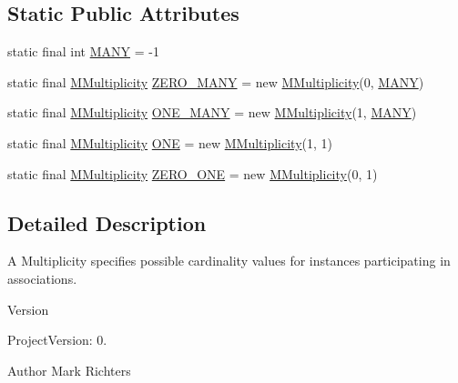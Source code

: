 \subsection*{Static Public Attributes}
\begin{DoxyCompactItemize}
\item 
static final int \hyperlink{classorg_1_1tzi_1_1use_1_1uml_1_1mm_1_1_m_multiplicity_acd7f611900ba6c8f7b48133cc4c4be22}{M\-A\-N\-Y} = -\/1
\item 
static final \hyperlink{classorg_1_1tzi_1_1use_1_1uml_1_1mm_1_1_m_multiplicity}{M\-Multiplicity} \hyperlink{classorg_1_1tzi_1_1use_1_1uml_1_1mm_1_1_m_multiplicity_aa8e47b2cffebf861497936c34fa386ca}{Z\-E\-R\-O\-\_\-\-M\-A\-N\-Y} = new \hyperlink{classorg_1_1tzi_1_1use_1_1uml_1_1mm_1_1_m_multiplicity}{M\-Multiplicity}(0, \hyperlink{classorg_1_1tzi_1_1use_1_1uml_1_1mm_1_1_m_multiplicity_acd7f611900ba6c8f7b48133cc4c4be22}{M\-A\-N\-Y})
\item 
static final \hyperlink{classorg_1_1tzi_1_1use_1_1uml_1_1mm_1_1_m_multiplicity}{M\-Multiplicity} \hyperlink{classorg_1_1tzi_1_1use_1_1uml_1_1mm_1_1_m_multiplicity_a3e0668632a54eb3646309e411c1bd4ef}{O\-N\-E\-\_\-\-M\-A\-N\-Y} = new \hyperlink{classorg_1_1tzi_1_1use_1_1uml_1_1mm_1_1_m_multiplicity}{M\-Multiplicity}(1, \hyperlink{classorg_1_1tzi_1_1use_1_1uml_1_1mm_1_1_m_multiplicity_acd7f611900ba6c8f7b48133cc4c4be22}{M\-A\-N\-Y})
\item 
static final \hyperlink{classorg_1_1tzi_1_1use_1_1uml_1_1mm_1_1_m_multiplicity}{M\-Multiplicity} \hyperlink{classorg_1_1tzi_1_1use_1_1uml_1_1mm_1_1_m_multiplicity_a89328dac434cd2a0ea8d48a6c75f54da}{O\-N\-E} = new \hyperlink{classorg_1_1tzi_1_1use_1_1uml_1_1mm_1_1_m_multiplicity}{M\-Multiplicity}(1, 1)
\item 
static final \hyperlink{classorg_1_1tzi_1_1use_1_1uml_1_1mm_1_1_m_multiplicity}{M\-Multiplicity} \hyperlink{classorg_1_1tzi_1_1use_1_1uml_1_1mm_1_1_m_multiplicity_a42d0fe840b8a6a410ff3c5f1572a065f}{Z\-E\-R\-O\-\_\-\-O\-N\-E} = new \hyperlink{classorg_1_1tzi_1_1use_1_1uml_1_1mm_1_1_m_multiplicity}{M\-Multiplicity}(0, 1)
\end{DoxyCompactItemize}


\subsection{Detailed Description}
A Multiplicity specifies possible cardinality values for instances participating in associations.

\begin{DoxyVersion}{Version}

\end{DoxyVersion}
\begin{DoxyParagraph}{Project\-Version\-:}
0. 
\end{DoxyParagraph}
\begin{DoxyAuthor}{Author}
Mark Richters 
\end{DoxyAuthor}


